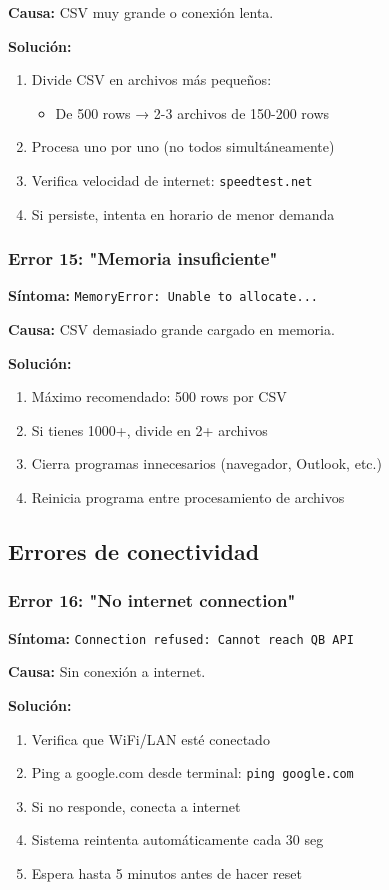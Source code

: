 \documentclass[12pt,oneside]{article}
\begin{document}
\textbf{Causa:} CSV muy grande o conexión lenta.

\textbf{Solución:}
\begin{enumerate}
    \item Divide CSV en archivos más pequeños:
    \begin{itemize}
        \item De 500 rows → 2-3 archivos de 150-200 rows
    \end{itemize}
    \item Procesa uno por uno (no todos simultáneamente)
    \item Verifica velocidad de internet: \texttt{speedtest.net}
    \item Si persiste, intenta en horario de menor demanda
\end{enumerate}

\subsubsection{Error 15: "Memoria insuficiente"}

\textbf{Síntoma:} \texttt{MemoryError: Unable to allocate...}

\textbf{Causa:} CSV demasiado grande cargado en memoria.

\textbf{Solución:}
\begin{enumerate}
    \item Máximo recomendado: 500 rows por CSV
    \item Si tienes 1000+, divide en 2+ archivos
    \item Cierra programas innecesarios (navegador, Outlook, etc.)
    \item Reinicia programa entre procesamiento de archivos
\end{enumerate}

\subsection{Errores de conectividad}

\subsubsection{Error 16: "No internet connection"}

\textbf{Síntoma:} \texttt{Connection refused: Cannot reach QB API}

\textbf{Causa:} Sin conexión a internet.

\textbf{Solución:}
\begin{enumerate}
    \item Verifica que WiFi/LAN esté conectado
    \item Ping a google.com desde terminal: \texttt{ping google.com}
    \item Si no responde, conecta a internet
    \item Sistema reintenta automáticamente cada 30 seg
    \item Espera hasta 5 minutos antes de hacer reset
\end{enumerate}
\end{document}
